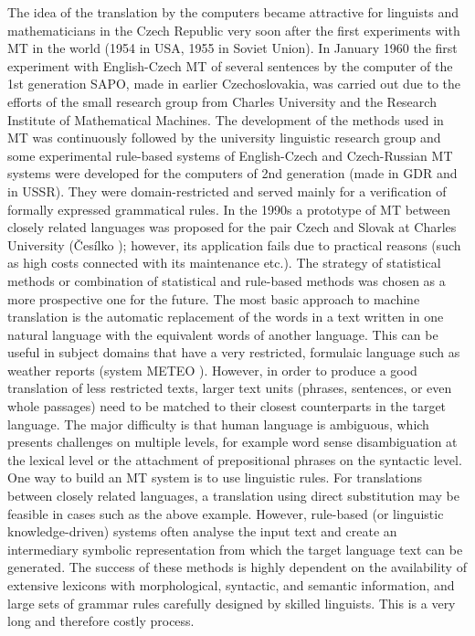 \begin{multicols}{2}
The idea of the translation by the computers became attractive for linguists and mathematicians in the Czech Republic very soon after the first experiments with MT in the world (1954 in USA, 1955 in Soviet Union). In January 1960 the first experiment with English-Czech MT of several sentences by the computer of the 1st generation SAPO, made in earlier Czechoslovakia, was carried out due to the efforts of the small research group from Charles University and the Research Institute of Mathematical Machines. The development of the methods used in MT was continuously followed by the university linguistic research group and some experimental rule-based systems of English-Czech and Czech-Russian MT systems were developed for the computers of 2nd generation (made in GDR and in USSR). They were domain-restricted and served mainly for a verification of formally expressed grammatical rules. In the 1990s a prototype of MT between closely related languages was proposed for the pair Czech and Slovak at Charles University (Česílko \cite{Note18}); however, its application fails due to practical reasons (such as high costs connected with its maintenance etc.). The strategy of statistical methods or combination of statistical and rule-based methods was chosen as a more prospective one for the future.
The most basic approach to machine translation is the automatic replacement of the words in a text written in one natural language with the equivalent words of another language. This can be useful in subject domains that have a very restricted, formulaic language such as weather reports (system METEO \cite{Note19}). However, in order to produce a good translation of less restricted texts, larger text units (phrases, sentences, or even whole passages) need to be matched to their closest counterparts in the target language. The major difficulty is that human language is ambiguous, which presents challenges on multiple levels, for example word sense disambiguation at the lexical level or the attachment of prepositional phrases on the syntactic level.\\
One way to build an MT system is to use linguistic rules. For translations between closely related languages, a translation using direct substitution may be feasible in cases such as the above example. However, rule-based (or linguistic knowledge-driven) systems often analyse the input text and create an intermediary symbolic representation from which the target language text can be generated. The success of these methods is highly dependent on the availability of extensive lexicons with morphological, syntactic, and semantic information, and large sets of grammar rules carefully designed by skilled linguists. This is a very long and therefore costly process.


\end{multicols}

